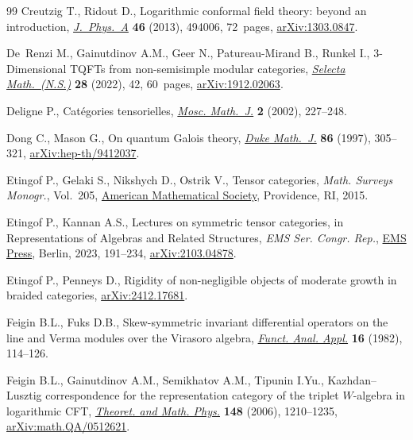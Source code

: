 \documentclass[pdftex]{sigma}
\numberwithin{equation}{section}
\theoremstyle{definition}
\begin{document}
\begin{thebibliography}{99}
Creutzig T., Ridout D., Logarithmic conformal field theory: beyond an
 introduction,
 \href{https://doi.org/10.1088/1751-8113/46/49/494006}{\textit{J.~Phys.~A}}
 \textbf{46} (2013), 494006, 72~pages,
 \href{http://arxiv.org/abs/1303.0847}{arXiv:1303.0847}.

De~Renzi M., Gainutdinov A.M., Geer N., Patureau-Mirand B., Runkel I.,
 3-{D}imensional {TQFT}s from non-semisimple modular categories,
 \href{https://doi.org/10.1007/s00029-021-00737-z}{\textit{Selecta
 Math.~(N.S.)}} \textbf{28} (2022), 42, 60~pages,
 \href{http://arxiv.org/abs/1912.02063}{arXiv:1912.02063}.

Deligne P., Cat\'egories tensorielles, \href{https://doi.org/10.17323/1609-4514-2002-2-2-227-248}{\textit{Mosc. Math.~J.}} \textbf{2} (2002), 227--248.

Dong C., Mason G., On quantum {G}alois theory,
 \href{https://doi.org/10.1215/S0012-7094-97-08609-9}{\textit{Duke Math.~J.}}
 \textbf{86} (1997), 305--321,
 \href{http://arxiv.org/abs/hep-th/9412037}{arXiv:hep-th/9412037}.

Etingof P., Gelaki S., Nikshych D., Ostrik V., Tensor categories, \textit{Math.
 Surveys Monogr.}, Vol.~205, \href{https://doi.org/10.1090/surv/205}{American
 Mathematical Society}, Providence, RI, 2015.

Etingof P., Kannan A.S., Lectures on symmetric tensor categories, in
 Representations of {A}lgebras and {R}elated {S}tructures, \textit{EMS Ser. Congr. Rep.}, \href{https://doi.org/10.4171/ECR/19/7}{EMS Press}, Berlin, 2023,
 191--234, \href{http://arxiv.org/abs/2103.04878}{arXiv:2103.04878}.

Etingof P., Penneys D., Rigidity of non-negligible objects of moderate growth
 in braided categories,
 \href{http://arxiv.org/abs/2412.17681}{arXiv:2412.17681}.

Feigin B.L., Fuks D.B., Skew-symmetric invariant differential operators on the
 line and {V}erma modules over the {V}irasoro algebra,
 \href{https://doi.org/10.1007/BF01081626}{\textit{Funct. Anal. Appl.}}
 \textbf{16} (1982), 114--126.

Feigin B.L., Gainutdinov A.M., Semikhatov A.M., Tipunin I.Yu.,
 {K}azhdan--{L}usztig correspondence for the representation category of the
 triplet $W$-algebra in logarithmic {CFT},
 \href{https://doi.org/10.1007/s11232-006-0113-6}{\textit{Theoret. and Math.
 Phys.}} \textbf{148} (2006), 1210--1235,
 \href{http://arxiv.org/abs/math.QA/0512621}{arXiv:math.QA/0512621}.


\end{thebibliography}
\end{document}
